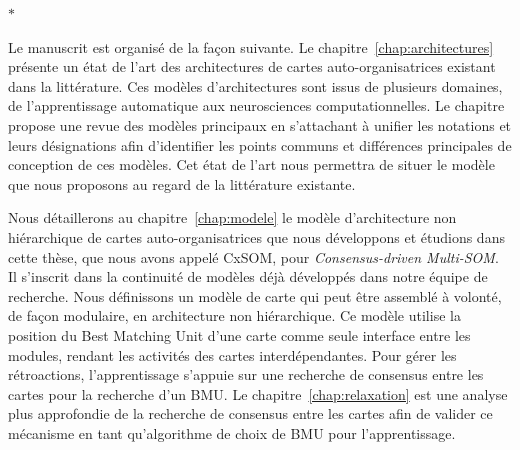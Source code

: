 \begin{center}
  $\ast$
\end{center}

Le manuscrit est organisé de la façon suivante.
Le chapitre~\ref{chap:architectures} présente un état de l'art des architectures de cartes auto-organisatrices existant dans la littérature. Ces modèles d'architectures sont issus de plusieurs domaines, de l'apprentissage automatique aux neurosciences computationnelles.
Le chapitre propose une revue des modèles principaux en s'attachant à unifier les notations et leurs désignations afin d'identifier les points communs et différences principales de conception de ces modèles.
Cet état de l'art nous permettra de situer le modèle que nous proposons au regard de la littérature existante.

Nous détaillerons au chapitre~\ref{chap:modele} le modèle d'architecture non hiérarchique de cartes auto-organisatrices que nous développons et étudions dans cette thèse, que nous avons appelé CxSOM, pour \emph{Consensus-driven Multi-SOM}. Il s'inscrit dans la continuité de modèles déjà développés dans notre équipe de recherche.
Nous définissons un modèle de carte qui peut être assemblé à volonté, de façon modulaire, en architecture non hiérarchique. Ce modèle utilise la position du Best Matching Unit d'une carte comme seule interface entre les modules, rendant les activités des cartes interdépendantes. Pour gérer les rétroactions, l'apprentissage s'appuie sur une recherche de consensus entre les cartes pour la recherche d'un BMU.
Le chapitre~\ref{chap:relaxation} est une analyse plus approfondie de la recherche de consensus entre les cartes afin de valider ce mécanisme en tant qu'algorithme de choix de BMU pour l'apprentissage.

